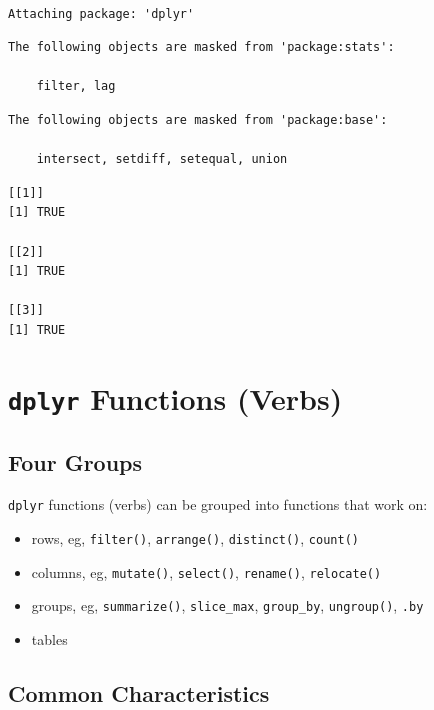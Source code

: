 \documentclass[
  letterpaper,
  DIV=11,
  numbers=noendperiod]{scrreprt}
\providecommand{\tightlist}{%
  \setlength{\itemsep}{0pt}\setlength{\parskip}{0pt}}\usepackage{longtable,booktabs,array}
\begin{document}
\begin{verbatim}

Attaching package: 'dplyr'
\end{verbatim}

\begin{verbatim}
The following objects are masked from 'package:stats':

    filter, lag
\end{verbatim}

\begin{verbatim}
The following objects are masked from 'package:base':

    intersect, setdiff, setequal, union
\end{verbatim}

\begin{verbatim}
[[1]]
[1] TRUE

[[2]]
[1] TRUE

[[3]]
[1] TRUE
\end{verbatim}

\section{\texorpdfstring{\texttt{dplyr} Functions
(Verbs)}{dplyr Functions (Verbs)}}\label{dplyr-functions-verbs}

\subsection{Four Groups}\label{four-groups}

\texttt{dplyr} functions (verbs) can be grouped into functions that work
on:

\begin{itemize}
\tightlist
\item
  rows, eg, \texttt{filter()}, \texttt{arrange()}, \texttt{distinct()},
  \texttt{count()}
\item
  columns, eg, \texttt{mutate()}, \texttt{select()}, \texttt{rename()},
  \texttt{relocate()}
\item
  groups, eg, \texttt{summarize()}, \texttt{slice\_max},
  \texttt{group\_by}, \texttt{ungroup()}, \texttt{.by}
\item
  tables
\end{itemize}

\subsection{Common Characteristics}\label{common-characteristics}
\end{document}
